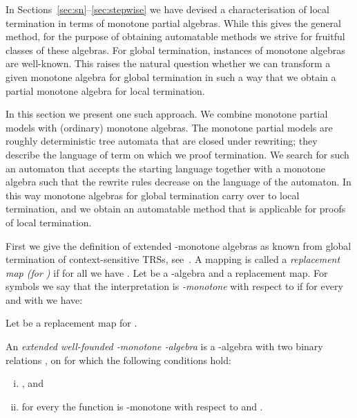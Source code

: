 \noindent In Sections~\ref{sec:sn}--\ref{sec:stepwise} we have devised
a characterisation of local termination in terms of monotone partial
algebras.  While this gives the general method, for the purpose of
obtaining automatable methods we strive for fruitful classes of these
algebras.  For global termination, instances of monotone algebras are
well-known.  This raises the natural question whether we can transform
a given monotone algebra for global termination in such a way that we
obtain a partial monotone algebra for local termination.

In this section we present one such approach.
We combine monotone partial models with (ordinary) monotone algebras.
The monotone partial models are roughly deterministic tree automata
that are closed under rewriting;
they describe the language of term on which we proof termination.
We search for such an automaton that accepts the starting language 
together with a monotone algebra such that the rewrite rules decrease
on the language of the automaton.
In this way monotone algebras for global termination carry over to local termination,
and we obtain an automatable method that 
is applicable for proofs of local termination.

First we give the definition of extended -monotone algebras as known from 
global termination of context-sensitive TRSs, see~\cite{luca:98,EWZ06}.
A mapping 
is called a \emph{replacement map (for )} if for all  we have
.
Let  be a -algebra and  a replacement map.
For symbols  we say that the interpretation 
is \emph{-monotone} with respect to 
if for every  and  with  we have:


\begin{definition}\normalfont\label{def:globalalg}
  Let  be a replacement map for .


  \noindent An \emph{extended well-founded -monotone -algebra 
  }
  is a -algebra 
  with two binary relations ,  on  for which
  the following conditions hold:
\begin{enumerate}[(i)]
\item , and
\item for every  the function  is -monotone with respect to  and .
  \end{enumerate}
\end{definition}


